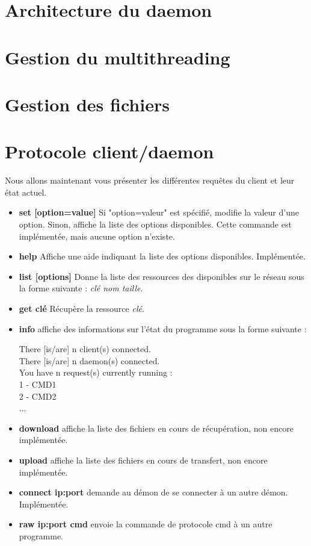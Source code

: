 	\section{Architecture du daemon}
	
	\section{Gestion du multithreading}
	
	\section{Gestion des fichiers}
	
    \section{Protocole client/daemon}
    Nous allons maintenant vous présenter les différentes requêtes du client et leur état actuel.

\begin{itemize}
\item{\textbf{set [option=value]}} Si "option=valeur" est spécifié, modifie la valeur
d'une option. Sinon, affiche la liste des options disponibles. Cette commande
est implémentée, mais aucune option n'existe.

\item{\textbf{help}} Affiche une aide indiquant la liste des options
disponibles. Implémentée.

\item{\textbf{list [options]}} Donne la liste des ressources des disponibles sur
le réseau sous la forme suivante : \textit{clé nom taille}.

\item{\textbf{get clé}} Récupère la ressource \textit{clé}.

\item{\textbf{info}} affiche des informations sur l'état du programme sous la
forme suivante :

There [is/are] n client(s) connected.     \\
There [is/are] n daemon(s) connected.     \\
You have n request(s) currently running : \\
1 - CMD1                                  \\ 
2 - CMD2                                  \\
...

\item{\textbf{download}} affiche la liste des fichiers en cours de récupération, non encore implémentée.

\item{\textbf{upload}} affiche la liste des fichiers en cours de transfert, non encore implémentée.

\item{\textbf{connect ip:port}} demande au démon de se connecter à un autre
démon. Implémentée.

\item{\textbf{raw ip:port cmd}} envoie la commande de protocole cmd à un autre programme.

\end{itemize} 
	
